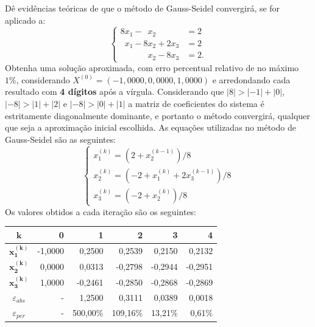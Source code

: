 \documentclass[12pt,a4paper]{article}
\begin{document}
\begin{ExerciseList}
\Exercise[title={2,0}]
Dê evidências teóricas de que o método de Gauss-Seidel convergirá, se for aplicado a:
\[
\begin{cases}
8x_1-\phantom{1}x_2\phantom{+ 0 x_3 } &= 2\\
\phantom{1}x_1-8x_2+2x_3 &= 2\\
\phantom{0x_1+1}x_2-8x_3 &= 2.
\end{cases}
\]
Obtenha uma solução aproximada, com erro percentual relativo de no máximo $1\%$, considerando $X^{(0)} = (-1,0000, 0,0000, 1,0000)$ e arredondando cada resultado com \textbf{4 dígitos} após a vírgula.
\Answer Considerando que
$|8| > |-1|+|0|$,
$|-8| > |1|+|2|$ e 
$|-8| > |0|+|1|$
a matriz de coeficientes do sistema é estritamente diagonalmente dominante, e portanto o método convergirá, qualquer que seja a aproximação inicial escolhida. As equações utilizadas no método de Gauss-Seidel são as seguintes:
\[
\begin{cases}
x_1^{(k)} = (2 + x_2^{(k-1)})/8\\
x_2^{(k)} = (-2 + x_1^{(k)} + 2x_3^{(k-1)})/8\\
x_3^{(k)} = (-2 + x_2^{(k)})/8
\end{cases}
\]
Os valores obtidos a cada iteração são os seguintes:
\medskip
\begin{center}
\begin{tabular}{|c|r|r|r|r|r|}
\hline
$\boldsymbol{k}$     & 0 & 1 & 2 & 3 & 4\\
\hline
$\boldsymbol{x_1^{(k)}}$ & -1,0000 &  0,2500 &  0,2539 &  0,2150 &  0,2132 \\
\hline
$\boldsymbol{x_2^{(k)}}$ &  0,0000 &  0,0313 & -0,2798 & -0,2944 & -0,2951 \\
\hline
$\boldsymbol{x_3^{(k)}}$ &  1,0000 & -0,2461 & -0,2850 & -0,2868 & -0,2869 \\
\hline
$\varepsilon_{abs}$ & - & 1,2500 & 0,3111 & 0,0389 & 0,0018 \\
\hline
$\varepsilon_{per}$ & - & 500,00\% & 109,16\% & 13,21\% & 0,61\% \\
\hline
\end{tabular}
\end{center}
\medskip



\end{ExerciseList}
\end{document}
